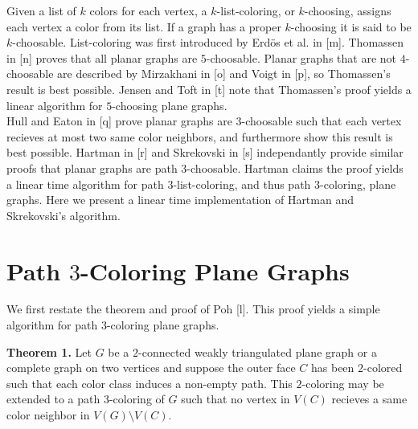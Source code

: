\documentclass[11pt,letter]{article}
\begin{document}
\noindent Given a list of $k$ colors for each vertex, a $k$-list-coloring, or $k$-choosing, assigns each vertex a
color from its list.
If a graph has a proper $k$-choosing it is said to be $k$-choosable. List-coloring was first introduced by
Erd{\"o}s et al. in [m]. Thomassen in [n] proves that all planar graphs are $5$-choosable. Planar
graphs that are not $4$-choosable are described by Mirzakhani in [o] and Voigt in [p], so Thomassen's result
is best possible. Jensen and Toft in [t] note that Thomassen's proof yields a linear algorithm for $5$-choosing
plane graphs.\\

\noindent Hull and Eaton in [q] prove planar graphs are $3$-choosable such that each vertex recieves at most two
same color neighbors, and furthermore show this result is best possible. Hartman in [r] and Skrekovski in [s] independantly
provide similar proofs that planar graphs are path $3$-choosable. Hartman claims the proof yields
a linear time algorithm for path $3$-list-coloring, and thus path $3$-coloring, plane graphs. Here we present a
linear time implementation of Hartman and Skrekovski's algorithm.

\section{Path $3$-Coloring Plane Graphs}

We first restate the theorem and proof of Poh [l]. This proof yields a simple algorithm for path $3$-coloring
plane graphs.\\

\begin{adjustwidth}{1.5em}{1.5em}
\noindent\textbf{Theorem 1.} Let $G$ be a $2$-connected weakly triangulated plane graph or a complete
graph on two vertices and
suppose the outer face $C$ has been $2$-colored such that each color class induces a non-empty path. This
$2$-coloring may be extended to a path $3$-coloring of $G$ such that no vertex in $V(C)$ recieves a same color
neighbor in $V(G)\setminus V(C)$.\\
\end{adjustwidth}
\end{document}
